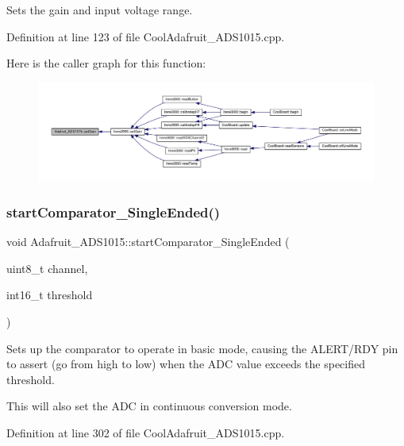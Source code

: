 Sets the gain and input voltage range. 



Definition at line 123 of file Cool\+Adafruit\+\_\+\+A\+D\+S1015.\+cpp.

Here is the caller graph for this function\+:
\nopagebreak
\begin{figure}[H]
\begin{center}
\leavevmode
\includegraphics[width=350pt]{class_adafruit___a_d_s1015_a399441eace686975ff22937cbe45cc50_icgraph}
\end{center}
\end{figure}
\mbox{\label{class_adafruit___a_d_s1015_aecd30775d943ea9d9cff0e3485926596}} 
\subsubsection{\texorpdfstring{start\+Comparator\+\_\+\+Single\+Ended()}{startComparator\_SingleEnded()}}
{\footnotesize\ttfamily void Adafruit\+\_\+\+A\+D\+S1015\+::start\+Comparator\+\_\+\+Single\+Ended (\begin{DoxyParamCaption}\item[{uint8\+\_\+t}]{channel,  }\item[{int16\+\_\+t}]{threshold }\end{DoxyParamCaption})}



Sets up the comparator to operate in basic mode, causing the A\+L\+E\+R\+T/\+R\+DY pin to assert (go from high to low) when the A\+DC value exceeds the specified threshold. 

This will also set the A\+DC in continuous conversion mode. 

Definition at line 302 of file Cool\+Adafruit\+\_\+\+A\+D\+S1015.\+cpp.

